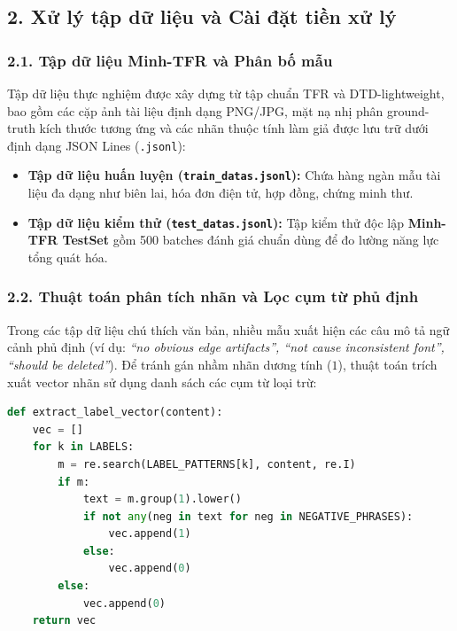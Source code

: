 \subsection{2. Xử lý tập dữ liệu và Cài đặt tiền xử lý}

\subsubsection{2.1. Tập dữ liệu Minh-TFR và Phân bố mẫu}
\indent\indent Tập dữ liệu thực nghiệm được xây dựng từ tập chuẩn TFR và DTD-lightweight, bao gồm các cặp ảnh tài liệu định dạng PNG/JPG, mặt nạ nhị phân ground-truth kích thước tương ứng và các nhãn thuộc tính làm giả được lưu trữ dưới định dạng JSON Lines (\texttt{.jsonl}):
\begin{itemize}[label={--}, itemsep=2pt]
    \item \textbf{Tập dữ liệu huấn luyện (\texttt{train\_datas.jsonl}):} Chứa hàng ngàn mẫu tài liệu đa dạng như biên lai, hóa đơn điện tử, hợp đồng, chứng minh thư.
    \item \textbf{Tập dữ liệu kiểm thử (\texttt{test\_datas.jsonl}):} Tập kiểm thử độc lập \textbf{Minh-TFR TestSet} gồm 500 batches đánh giá chuẩn dùng để đo lường năng lực tổng quát hóa.
\end{itemize}

\subsubsection{2.2. Thuật toán phân tích nhãn và Lọc cụm từ phủ định}
\indent\indent Trong các tập dữ liệu chú thích văn bản, nhiều mẫu xuất hiện các câu mô tả ngữ cảnh phủ định (ví dụ: \textit{``no obvious edge artifacts'', ``not cause inconsistent font'', ``should be deleted''}). Để tránh gán nhầm nhãn dương tính ($1$), thuật toán trích xuất vector nhãn sử dụng danh sách các cụm từ loại trừ:
\begin{lstlisting}[language=Python, frame=single, caption={Thuật toán trích xuất vector nhãn 6 chiều}]
def extract_label_vector(content):
    vec = []
    for k in LABELS:
        m = re.search(LABEL_PATTERNS[k], content, re.I)
        if m:
            text = m.group(1).lower()
            if not any(neg in text for neg in NEGATIVE_PHRASES):
                vec.append(1)
            else:
                vec.append(0)
        else:
            vec.append(0)
    return vec
\end{lstlisting}

